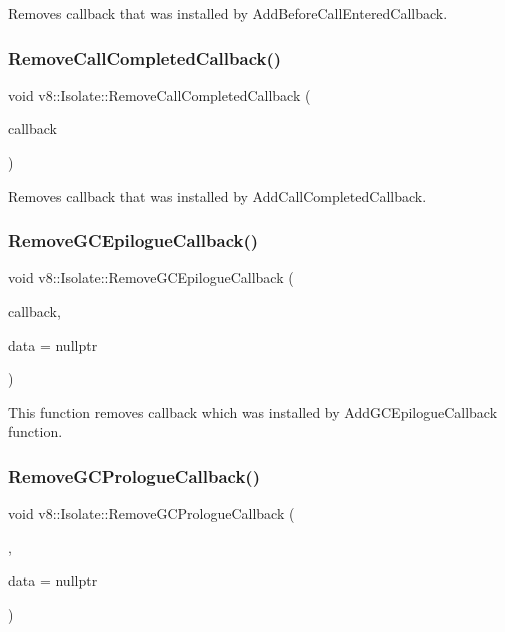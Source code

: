 Removes callback that was installed by Add\+Before\+Call\+Entered\+Callback. \mbox{\label{classv8_1_1Isolate_a46f0a5d35f8b29030922bdb433c0dc4f}} 
\subsubsection{\texorpdfstring{Remove\+Call\+Completed\+Callback()}{RemoveCallCompletedCallback()}}
{\footnotesize\ttfamily void v8\+::\+Isolate\+::\+Remove\+Call\+Completed\+Callback (\begin{DoxyParamCaption}\item[{Call\+Completed\+Callback}]{callback }\end{DoxyParamCaption})}

Removes callback that was installed by Add\+Call\+Completed\+Callback. \mbox{\label{classv8_1_1Isolate_a1a545df3b2b4617ac57f8768025619f8}} 
\subsubsection{\texorpdfstring{Remove\+G\+C\+Epilogue\+Callback()}{RemoveGCEpilogueCallback()}}
{\footnotesize\ttfamily void v8\+::\+Isolate\+::\+Remove\+G\+C\+Epilogue\+Callback (\begin{DoxyParamCaption}\item[{G\+C\+Callback\+With\+Data}]{callback,  }\item[{void $\ast$}]{data = {\ttfamily nullptr} }\end{DoxyParamCaption})}

This function removes callback which was installed by Add\+G\+C\+Epilogue\+Callback function. \mbox{\label{classv8_1_1Isolate_afa22be664707d55616cb6786be278171}} 
\subsubsection{\texorpdfstring{Remove\+G\+C\+Prologue\+Callback()}{RemoveGCPrologueCallback()}}
{\footnotesize\ttfamily void v8\+::\+Isolate\+::\+Remove\+G\+C\+Prologue\+Callback (\begin{DoxyParamCaption}\item[{G\+C\+Callback\+With\+Data}]{,  }\item[{void $\ast$}]{data = {\ttfamily nullptr} }\end{DoxyParamCaption})}

